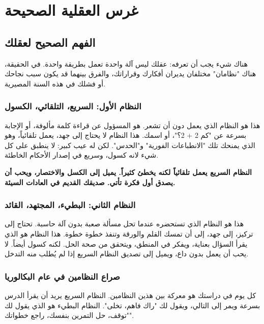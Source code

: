 \documentclass[12pt,a4paper]{book}
\newcommand{\importantAr}[1]{%
	\begin{important}
		\bfseries #1
	\end{important}
}
\begin{document}
	\chapter{غرس العقلية الصحيحة}
	\label{chap:mindset}
	
	
	\section{الفهم الصحيح لعقلك}
	\label{sec:two-systems}
	
	هناك شيء يجب أن تعرفه: عقلك ليس آلة واحدة تعمل بطريقة واحدة. في الحقيقة، هناك "نظامان" مختلفان يديران أفكارك وقراراتك، والفرق بينهما قد يكون سبب نجاحك أو فشلك في هذه السنة المصيرية.
	
	\subsection{النظام الأول: السريع، التلقائي، الكسول}
	
	هذا هو النظام الذي يعمل دون أن تشعر. هو المسؤول عن قراءة كلمة مألوفة، أو الإجابة بسرعة عن "كم 2 + 2؟"، أو اسمك. هذا النظام لا يحتاج إلى جهد، يعمل تلقائياً، وهو الذي يمنحك تلك "الانطباعات الفورية" و"الحدس". لكن له عيب كبير:  لا ينطبق على كل شيء لانه كسول، وسريع في إصدار الأحكام الخاطئة.
	
	\importantAr{النظام السريع يعمل تلقائياً لكنه يخطئ كثيراً. يميل إلى الكسل والاختصار، ويحب أن يصدق أول فكرة تأتي. صديقك القديم في العادات السيئة.}
	
	\subsection{النظام الثاني: البطيء، المجتهد، القائد}
	
	هذا هو النظام الذي تستحضره عندما تحل مسألة صعبة بدون آلة حاسبة. تحتاج إلى تركيز، إلى جهد، إلى أن تمسك القلم والورقة وتنفذ خطوة خطوة. هذا النظام هو الذي يقرأ السؤال بعناية، ويفكر في المنطق، ويتحقق من صحة الحل. لكنه كسول أيضاً. لا يحب أن يعمل بدون داع، ويميل إلى تصديق النظام السريع إذا لم يُطلب منه التدخل.
	
	\subsection{صراع النظامين في عام البكالوريا}
	
	كل يوم في دراستك هو معركة بين هذين النظامين. النظام السريع يريد أن يقرأ الدرس بسرعة ويمر إلى التالي، ويقول لك "راك فاهم، تخلى". النظام البطيء هو الذي يقول لك "توقف، حل التمرين بنفسك، راجع خطواتك".
	
\end{document}
